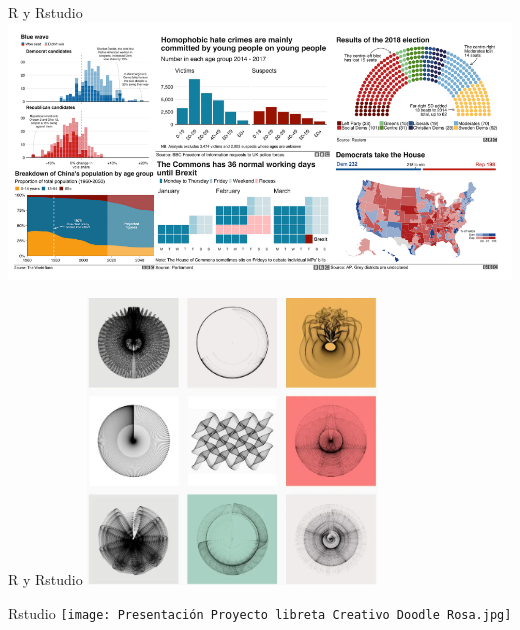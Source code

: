 \documentclass[
  30pt,
  ignorenonframetext,
]{beamer}
\begin{document}
\begin{frame}{R y Rstudio}
\label{r-y-rstudio-1}
\includegraphics[width=5.625in,height=\textheight]{GrafR.png}
\end{frame}

\begin{frame}{R y Rstudio}
\label{r-y-rstudio-2}
\includegraphics[width=3.03125in,height=\textheight]{ArteR.png}
\end{frame}

\begin{frame}{Rstudio}
\label{rstudio}
\texttt{[image: Presentación Proyecto libreta Creativo Doodle Rosa.jpg]}
\end{frame}
\end{document}
